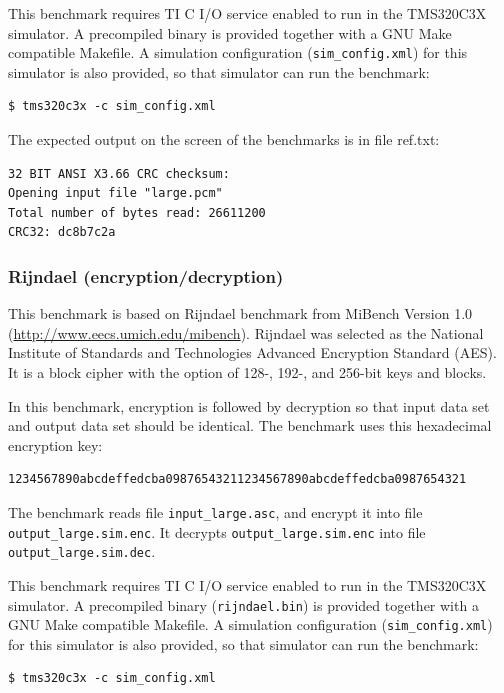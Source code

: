 This benchmark requires TI C I/O service enabled to run in the TMS320C3X simulator.
A precompiled binary is provided together with a GNU Make compatible Makefile.
A simulation configuration (\texttt{sim\_config.xml}) for this simulator is also provided, so that simulator can run the benchmark:

\begin{verbatim}
$ tms320c3x -c sim_config.xml
\end{verbatim}

\noindent The expected output on the screen of the benchmarks is in file ref.txt:

\begin{verbatim}
32 BIT ANSI X3.66 CRC checksum:
Opening input file "large.pcm"
Total number of bytes read: 26611200
CRC32: dc8b7c2a
\end{verbatim}

\subsubsection{Rijndael (encryption/decryption)}

This benchmark is based on Rijndael benchmark from MiBench Version 1.0 (\url{http://www.eecs.umich.edu/mibench}).
Rijndael was selected as the National Institute of Standards and Technologies Advanced Encryption Standard (AES).
It is a block cipher with the option of 128-, 192-, and 256-bit keys and blocks.

In this benchmark, encryption is followed by decryption so that input data set and output data set should be identical.
The benchmark uses this hexadecimal encryption key:
\begin{verbatim}
1234567890abcdeffedcba09876543211234567890abcdeffedcba0987654321
\end{verbatim}
The benchmark reads file \texttt{input\_large.asc}, and encrypt it into file \texttt{output\_large.sim.enc}.
It decrypts \texttt{output\_large.sim.enc} into file \texttt{output\_large.sim.dec}.

This benchmark requires TI C I/O service enabled to run in the TMS320C3X simulator.
A precompiled binary (\texttt{rijndael.bin}) is provided together with a GNU Make compatible Makefile.
A simulation configuration (\texttt{sim\_config.xml}) for this simulator is also provided, so that simulator can run the benchmark:

\begin{verbatim}
$ tms320c3x -c sim_config.xml
\end{verbatim}

